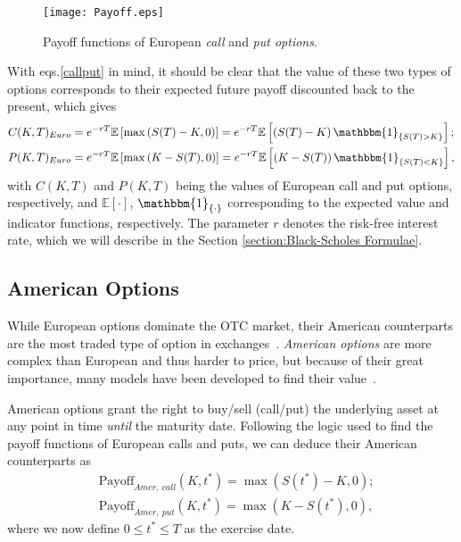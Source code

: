 \begin{figure}[!htb]
    \centering
      \texttt{[image: Payoff.eps]}
      \caption[Payoff functions of European call and put options]{Payoff functions of European \emph{call} and \emph{put options}.}\label{fig:Payoff}
    \end{figure}
    
With eqs.\eqref{callput} in mind, it should be clear that the value of these two types of options corresponds to their expected future payoff discounted back to the present, which gives
\begin{equation}
\begin{split}
&C(K,T)_{Euro}=e^{-rT}\mathbb{E}\left[\max\left(S(T)-K,0\right)\right]=e^{-rT}\mathbb{E}\left[\left(S(T)-K\right)\mathbbm{1}_{\left\{S(T)>K\right\}}\right];\\
&P(K,T)_{Euro}=e^{-rT}\mathbb{E}\left[\max\left(K-S(T),0\right)\right]=e^{-rT}\mathbb{E}\left[\left(K-S(T)\right)\mathbbm{1}_{\left\{S(T)<K\right\}}\right],
\end{split}
\end{equation}
\noindent with $C(K,T)$ and $P(K,T)$ being the values of European call and put options, respectively, and $\mathbb{E}[\cdot]$, $\mathbbm{1}_{\{\cdot\}}$ corresponding to the expected value and indicator functions, respectively. The parameter $r$ denotes the risk-free interest rate, which we will describe in the Section \ref{section:Black-Scholes Formulae}.


\subsection{American Options}
While European options dominate the OTC market, their American counterparts are the most traded type of option in exchanges~\cite{InvAmer}. \emph{American options} are more complex than European and thus harder to price, but because of their great importance, many models have been developed to find their value~\cite{Longstaff}.

American options grant the right to buy/sell (call/put) the underlying asset at any point in time \emph{until} the maturity date. Following the logic used to find the payoff functions of European calls and puts, we can deduce their American counterparts as
\begin{equation}
\begin{split}
&\text{Payoff}_{Amer,\ call}(K,t^*)=\max\left(S(t^*)-K,0\right);\\
&\text{Payoff}_{Amer,\ put}(K,t^*)=\max\left(K-S(t^*),0\right),
\end{split}
\end{equation}
\noindent where we now define $0\leq t^*\leq T$ as the exercise date.


